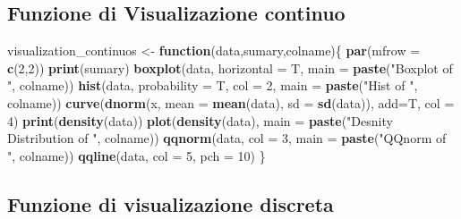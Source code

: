 \documentclass[
]{article}
\newenvironment{Shaded}{\begin{snugshade}}{\end{snugshade}}
\newcommand{\AttributeTok}[1]{\textcolor[rgb]{0.13,0.29,0.53}{#1}}
\newcommand{\ControlFlowTok}[1]{\textcolor[rgb]{0.13,0.29,0.53}{\textbf{#1}}}
\newcommand{\DecValTok}[1]{\textcolor[rgb]{0.00,0.00,0.81}{#1}}
\newcommand{\FunctionTok}[1]{\textcolor[rgb]{0.13,0.29,0.53}{\textbf{#1}}}
\newcommand{\NormalTok}[1]{#1}
\newcommand{\OtherTok}[1]{\textcolor[rgb]{0.56,0.35,0.01}{#1}}
\newcommand{\StringTok}[1]{\textcolor[rgb]{0.31,0.60,0.02}{#1}}
\begin{document}
\subsection{Funzione di Visualizazione
continuo}\label{funzione-di-visualizazione-continuo}

\begin{Shaded}
\begin{Highlighting}[]
\NormalTok{visualization\_continuos }\OtherTok{\textless{}{-}} \ControlFlowTok{function}\NormalTok{(data,sumary,colname)\{}
  \FunctionTok{par}\NormalTok{(}\AttributeTok{mfrow =} \FunctionTok{c}\NormalTok{(}\DecValTok{2}\NormalTok{,}\DecValTok{2}\NormalTok{))}
  \FunctionTok{print}\NormalTok{(sumary)}
  \FunctionTok{boxplot}\NormalTok{(data, }\AttributeTok{horizontal =}\NormalTok{ T, }\AttributeTok{main =} \FunctionTok{paste}\NormalTok{(}\StringTok{"Boxplot of "}\NormalTok{, colname))}
  \FunctionTok{hist}\NormalTok{(data, }\AttributeTok{probability =}\NormalTok{ T, }\AttributeTok{col =} \DecValTok{2}\NormalTok{, }\AttributeTok{main =} \FunctionTok{paste}\NormalTok{(}\StringTok{"Hist of "}\NormalTok{, colname))}
  \FunctionTok{curve}\NormalTok{(}\FunctionTok{dnorm}\NormalTok{(x, }\AttributeTok{mean =} \FunctionTok{mean}\NormalTok{(data), }\AttributeTok{sd =} \FunctionTok{sd}\NormalTok{(data)),}
        \AttributeTok{add=}\NormalTok{T, }\AttributeTok{col =} \DecValTok{4}\NormalTok{)}
  \FunctionTok{print}\NormalTok{(}\FunctionTok{density}\NormalTok{(data))}
  \FunctionTok{plot}\NormalTok{(}\FunctionTok{density}\NormalTok{(data), }\AttributeTok{main =} \FunctionTok{paste}\NormalTok{(}\StringTok{"Desnity Distribution of "}\NormalTok{, colname))}
  \FunctionTok{qqnorm}\NormalTok{(data, }\AttributeTok{col =} \DecValTok{3}\NormalTok{, }\AttributeTok{main =} \FunctionTok{paste}\NormalTok{(}\StringTok{"QQnorm of "}\NormalTok{, colname))}
  \FunctionTok{qqline}\NormalTok{(data, }\AttributeTok{col =} \DecValTok{5}\NormalTok{, }\AttributeTok{pch =} \DecValTok{10}\NormalTok{)}
\NormalTok{\}}
\end{Highlighting}
\end{Shaded}

\subsection{Funzione di visualizazione
discreta}\label{funzione-di-visualizazione-discreta}
\end{document}
